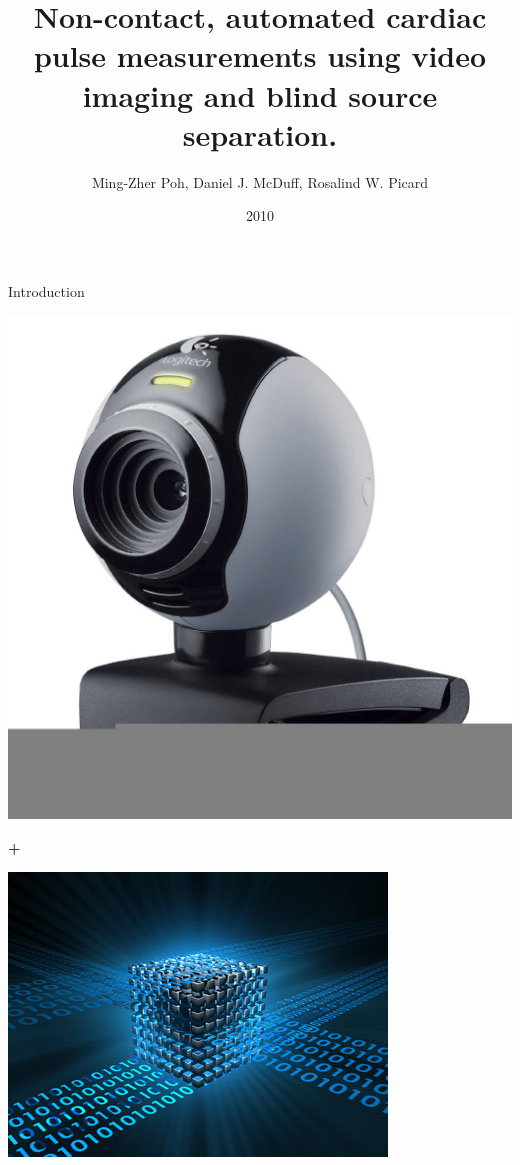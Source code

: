 \documentclass{beamer}
\title{Non-contact, automated cardiac pulse measurements using video imaging and blind source separation.}
\author{Ming-Zher Poh, Daniel J. McDuff, Rosalind W. Picard}
\date{2010}
\begin{document}
\newcommand{\mytitle}[1]{{\Large{\underline{#1}}}}
\newcommand{\positiveaspect}{\textcolor{green}{$\oplus$}}
\newcommand{\negativeaspect}{\textcolor{red}{$\ominus$}}


\begin{frame}{Introduction}
	\begin{minipage}[c]{0.25\textwidth}
		\includegraphics[width=\textwidth]{webcam.jpg}
	\end{minipage}
	\textbf{\huge{+}}
	\begin{minipage}[c]{0.25\textwidth}
		\includegraphics[width=\textwidth]{data-processing.jpg}

\end{minipage}
\end{frame}
\end{document}
